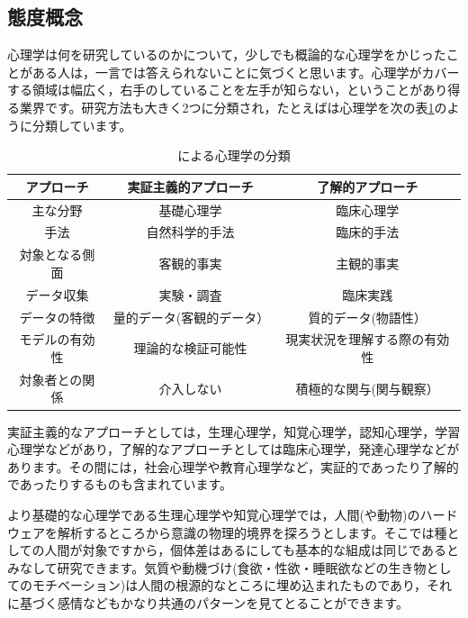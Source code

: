 \documentclass{ltjsbook}
\begin{document}
\subsection{態度概念}

心理学は何を研究しているのかについて，少しでも概論的な心理学をかじったことがある人は，一言では答えられないことに気づくと思います。心理学がカバーする領域は幅広く，右手のしていることを左手が知らない，ということがあり得る業界です。研究方法も大きく2つに分類され，たとえば\citet{Shimoyama2001}は心理学を次の表\ref{tbl01_01}のように分類しています。

\begin{table}[h]
    \centering
    \caption{\citet{Shimoyama2001}による心理学の分類}
    \begin{tabular}{ccc}
        アプローチ   & 実証主義的アプローチ    & 了解的アプローチ       \\\hline
        主な分野    & 基礎心理学         & 臨床心理学          \\
        手法      & 自然科学的手法       & 臨床的手法          \\
        対象となる側面 & 客観的事実         & 主観的事実          \\
        データ収集   & 実験・調査         & 臨床実践           \\
        データの特徴  & 量的データ(客観的データ） & 質的データ(物語性）     \\
        モデルの有効性 & 理論的な検証可能性     & 現実状況を理解する際の有効性 \\
        対象者との関係 & 介入しない         & 積極的な関与(関与観察）   \\\hline
    \end{tabular}
    \label{tbl01_01}
\end{table}

実証主義的なアプローチとしては，生理心理学，知覚心理学，認知心理学，学習心理学などがあり，了解的なアプローチとしては臨床心理学，発達心理学などがあります。その間には，社会心理学や教育心理学など，実証的であったり了解的であったりするものも含まれています。

より基礎的な心理学である生理心理学や知覚心理学では，人間(や動物)のハードウェアを解析するところから意識の物理的境界を探ろうとします。そこでは種としての人間が対象ですから，個体差はあるにしても基本的な組成は同じであるとみなして研究できます。気質や動機づけ(食欲・性欲・睡眠欲などの生き物としてのモチベーション)は人間の根源的なところに埋め込まれたものであり，それに基づく感情などもかなり共通のパターンを見てとることができます。
\end{document}
